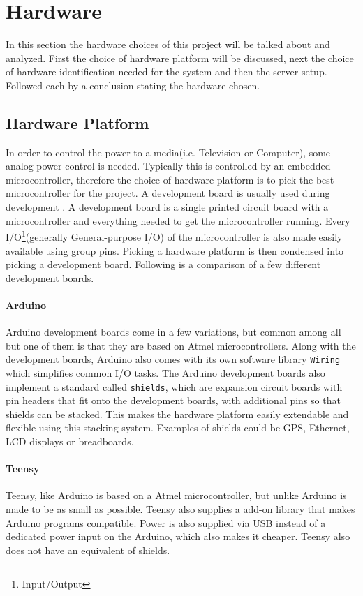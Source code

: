 \chapter{Hardware}
\label{chap:hardware}
In this section the hardware choices of this project will be talked about and analyzed. First the choice of hardware platform will be discussed, next the choice of hardware identification needed for the system and then the server setup. Followed each by a conclusion stating the hardware chosen.

\section{Hardware Platform}
In order to control the power to a media(i.e. Television or Computer), some analog power control is needed. Typically this is controlled by an embedded microcontroller, therefore the choice of hardware platform is to pick the best microcontroller for the project. A development board is usually used during development . A development board is a single printed circuit board with a microcontroller and everything needed to get the microcontroller running. Every I/O\footnote{Input/Output}(generally General-purpose I/O) of the microcontroller is also made easily available using group pins. Picking a hardware platform is then condensed into picking a development board. Following is a comparison of a few different development boards.

\subsubsection{Arduino}
Arduino development boards come in a few variations, but common among all but one of them is that they are based on Atmel microcontrollers. Along with the development boards, Arduino also comes with its own software library \texttt{Wiring} which simplifies common I/O tasks. The Arduino development boards also implement a standard called \texttt{shields}, which are expansion circuit boards with pin headers that fit onto the development boards, with additional pins so that shields can be stacked. This makes the hardware platform easily extendable and flexible using this stacking system. Examples of shields could be GPS, Ethernet, LCD displays or breadboards.


\subsubsection{Teensy}
Teensy, like Arduino is based on a Atmel microcontroller, but unlike Arduino is made to be as small as possible. Teensy also supplies a add-on library that makes Arduino programs compatible. Power is also supplied via USB instead of a dedicated power input on the Arduino, which also makes it cheaper. Teensy also does not have an equivalent of shields.


